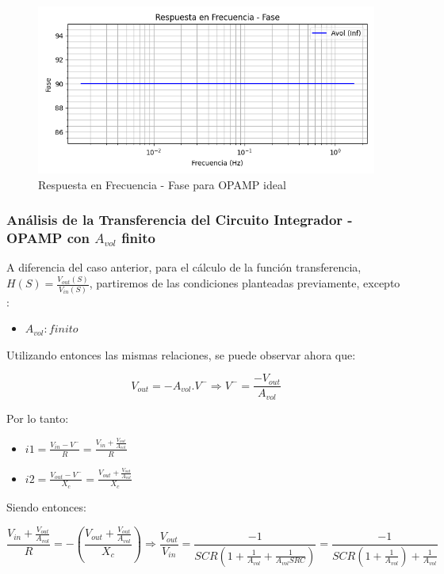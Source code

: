 \begin{figure}[H]
    \centering 
    \includegraphics [scale=0.6] {../Ejercicio3-CircuitoIntegradoresyDerivadores/Imagenes/teorico-avol-inf-integrador-fase.png} 
    \caption{Respuesta en Frecuencia - Fase para OPAMP ideal}
    \label{fig:emptyPlotTool}
\end{figure}

\subsubsection{Análisis de la Transferencia del Circuito Integrador - OPAMP con $A_{vol}$ finito}

A diferencia del caso anterior, para el cálculo de la función transferencia, $H(S) = \frac{V_{out} (S)}{V_{in} (S)}$, partiremos de las condiciones planteadas previamente, excepto
:

\begin{itemize}
	\item $A_{vol}: finito$
\end{itemize}

Utilizando entonces las mismas relaciones, se puede observar ahora que:


$$V_{out}=-A_{vol}.V^{-} \Longrightarrow V^{-} = \frac{-V_{out}}{A_{vol}}$$ 


Por lo tanto:

\begin{itemize}
	\item $i1 = \frac {V_{in}-V^{-}}{R} =  \frac {V_{in} + \frac{V_{out}}{A_{vol}}}{R}$
	\item $i2 = \frac {V_{out}-V^{-}}{X_c} = \frac {V_{out} + \frac{V_{out}}{A_{vol}}}{X_c}$
\end{itemize}

Siendo entonces:

$$ \frac {V_{in} + \frac{V_{out}}{A_{vol}}}{R} = -(\frac {V_{out} + \frac{V_{out}}{A_{vol}}}{X_c})
\Longrightarrow \frac{V_{out}}{V_{in}} = \frac{-1}{SCR(1+\frac{1}{A_{vol}}+\frac{1}{A_{vol}SRC})} = \frac{-1}{SCR(1+\frac{1}{A_{vol}})+\frac{1}{A_{vol}}}$$

